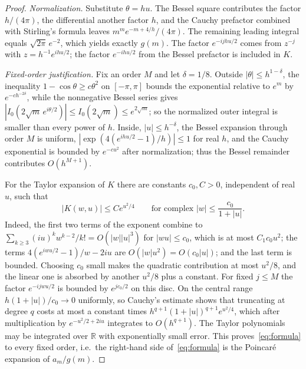 \documentclass[11pt,a4paper]{article}
\theoremstyle{remark}
\begin{document}
\begin{proof}
\emph{Normalization.} Substitute $\theta=hu$. The Bessel square contributes the factor $h/(4\pi)$, the differential another factor $h$, and the Cauchy prefactor combined with Stirling's formula leaves $m^me^{-m+4/h}/(4\pi)$. The remaining leading integral equals $\sqrt{2\pi}\,e^{-2}$, which yields exactly $g(m)$. The factor $e^{-ijhu/2}$ comes from $z^{-j}$ with $z=h^{-1}e^{ihu/2}$; the factor $e^{-ihu/2}$ from the Bessel prefactor is included in $K$.

\emph{Fixed-order justification.} Fix an order $M$ and let $\delta=1/8$. Outside $|\theta|\le h^{1-\delta}$, the inequality $1-\cos\theta\ge c\theta^2$ on $[-\pi,\pi]$ bounds the exponential relative to $e^m$ by $e^{-ch^{-2\delta}}$, while the nonnegative Bessel series gives $|I_0(2\sqrt m\,e^{i\theta/2})|\le I_0(2\sqrt m)\le e^{2\sqrt m}$; so the normalized outer integral is smaller than every power of $h$. Inside, $|u|\le h^{-\delta}$, the Bessel expansion through order $M$ is uniform, $|\exp(4(e^{ihu/2}-1)/h)|\le1$ for real $h$, and the Cauchy exponential is bounded by $e^{-cu^2}$ after normalization; thus the Bessel remainder contributes $O(h^{M+1})$.

For the Taylor expansion of $K$ there are constants $c_0,C>0$, independent of real $u$, such that
\begin{equation}\label{eq:Kbound}
  |K(w,u)|\le Ce^{u^2/4}\qquad\text{for complex } |w|\le\frac{c_0}{1+|u|} .
\end{equation}
Indeed, the first two terms of the exponent combine to $\sum_{k\ge3}(iu)^kw^{k-2}/k!=O(|w||u|^3)$ for $|wu|\le c_0$, which is at most $C_1c_0u^2$; the terms $4(e^{iwu/2}-1)/w-2iu$ are $O(|w|u^2)=O(c_0|u|)$; and the last term is bounded. Choosing $c_0$ small makes the quadratic contribution at most $u^2/8$, and the linear one is absorbed by another $u^2/8$ plus a constant. For fixed $j\le M$ the factor $e^{-ijwu/2}$ is bounded by $e^{jc_0/2}$ on this disc. On the central range $h(1+|u|)/c_0\to0$ uniformly, so Cauchy's estimate shows that truncating at degree $q$ costs at most a constant times $h^{q+1}(1+|u|)^{q+1}e^{u^2/4}$, which after multiplication by $e^{-u^2/2+2iu}$ integrates to $O(h^{q+1})$. The Taylor polynomials may be integrated over $\mathbb R$ with exponentially small error. This proves~\eqref{eq:formula} to every fixed order, i.e.\ the right-hand side of~\eqref{eq:formula} is the Poincar\'e expansion of $a_m/g(m)$.


\end{proof}
\end{document}
